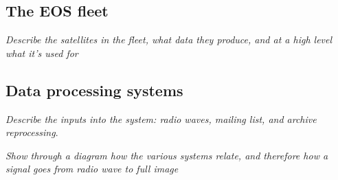 
\subsection{The EOS fleet}

\textit{Describe the satellites in the fleet, what data they produce, and at a high level what it's used for}




\subsection{Data processing systems}

\textit{Describe the inputs into the system: radio waves, mailing list, and archive reprocessing}.

\textit{Show through a diagram how the various systems relate, and therefore how a signal goes from radio wave to full image} \\

